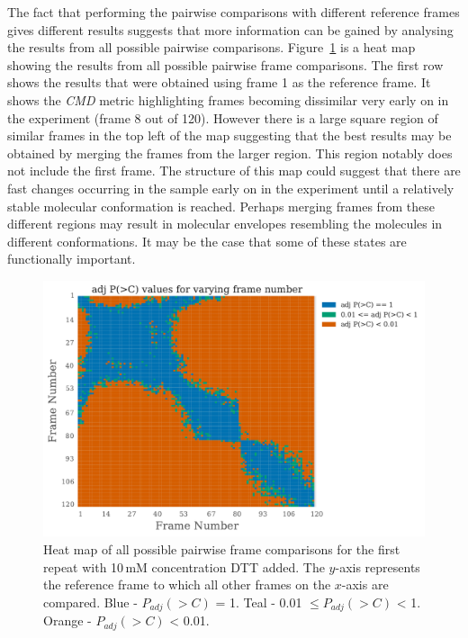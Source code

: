 The fact that performing the pairwise comparisons with different reference frames gives different results suggests that more information can be gained by analysing the results from all possible pairwise comparisons.
Figure~\ref{fig:heatmap - DTT} is a heat map showing the results from all possible pairwise frame comparisons.
The first row shows the results that were obtained using frame 1 as the reference frame.
It shows the \textit{CMD} metric highlighting frames becoming dissimilar very early on in the experiment (frame 8 out of 120).
However there is a large square region of similar frames in the top left of the map suggesting that the best results may be obtained by merging the frames from the larger region.
This region notably does not include the first frame.
The structure of this map could suggest that there are fast changes occurring in the sample early on in the experiment until a relatively stable molecular conformation is reached.
Perhaps merging frames from these different regions may result in molecular envelopes resembling the molecules in different conformations.
It may be the case that some of these states are functionally important.
\begin{figure}
    \centering
    \includegraphics[width=1.0\textwidth]{figures/saxs/dtt_heatmap.pdf}
    \caption[Heat map of all possible pairwise frame comparisons for the first repeat with 10\,mM concentration DTT added]{Heat map of all possible pairwise frame comparisons for the first repeat with 10\,mM concentration DTT added.
    The $y$-axis represents the reference frame to which all other frames on the $x$-axis are compared.
    Blue - $P_{adj}(>C)$ = 1. Teal - 0.01 $\le P_{adj}(>C)$ < 1. Orange - $P_{adj}(>C)$ < 0.01.}
    \label{fig:heatmap - DTT}
\end{figure}

